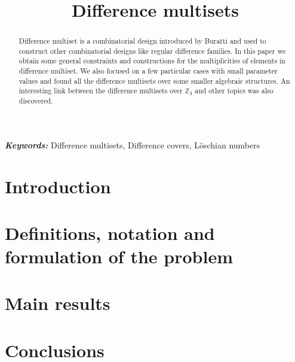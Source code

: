 \documentclass{article}
\title{Difference multisets}
\date{}
\author{}
\theoremstyle{plain}
\theoremstyle{definition}
\theoremstyle{remark}
\providecommand{\keywords}[1]{\textbf{\textit{Keywords: }} #1}
\begin{document}
	\maketitle
	
	\begin{abstract}
		Difference multiset is a combinatorial design introduced by Buratti \cite{buratti1999old} and used to construct other combinatorial designs like regular difference families. In this paper we obtain some general constraints and constructions for the multiplicities of elements in difference multiset. We also focused on a few particular cases with small parameter values and found all the difference multisets over some smaller algebraic structures. An interesting link between the difference multisets over $\mathbb Z_3$ and other topics was also discovered.
	\end{abstract}
	
	\keywords{Difference multisets, Difference covers, Löschian numbers}
    
    \section{Introduction}
    
     
	\section{Definitions, notation and formulation of the problem}
    
	
    \section{Main results}
    

    \section{Conclusions}
    
    
	
	 
	
\end{document}
